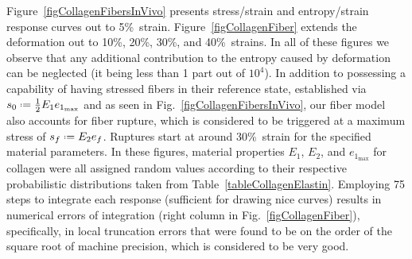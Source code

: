 Figure~\ref{figCollagenFibersInVivo} presents stress\slash strain and entropy\slash strain response curves out to 5\%\ strain.  Figure~\ref{figCollagenFiber} extends the deformation out to 10\%, 20\%, 30\%, and 40\%\ strains.  In all of these figures we observe that any additional contribution to the entropy caused by deformation can be neglected (it being less than 1 part out of $10^4$).  In addition to possessing a capability of having stressed fibers in their reference state, established via $s_0 \defeq \tfrac{1}{2} E_1 e_{1_{\max}}$ and as seen in Fig.~\ref{figCollagenFibersInVivo}, our fiber model also accounts for fiber rupture, which is considered to be triggered at a maximum stress of $s_f \defeq E_2 e_f$.  Ruptures start at around 30\%\ strain for the specified material parameters.  In these figures, material properties  $E_1$, $E_2$, and $e_{1_{\max}}$ for collagen were all assigned random values according to their respective probabilistic distributions taken from Table~\ref{tableCollagenElastin}.  Employing 75 steps to integrate each response (sufficient for drawing nice curves) results in numerical errors of integration (right column in Fig.~\ref{figCollagenFiber}), specifically, in local truncation errors that were found to be on the order of the square root of machine precision, which is considered to be very good.

